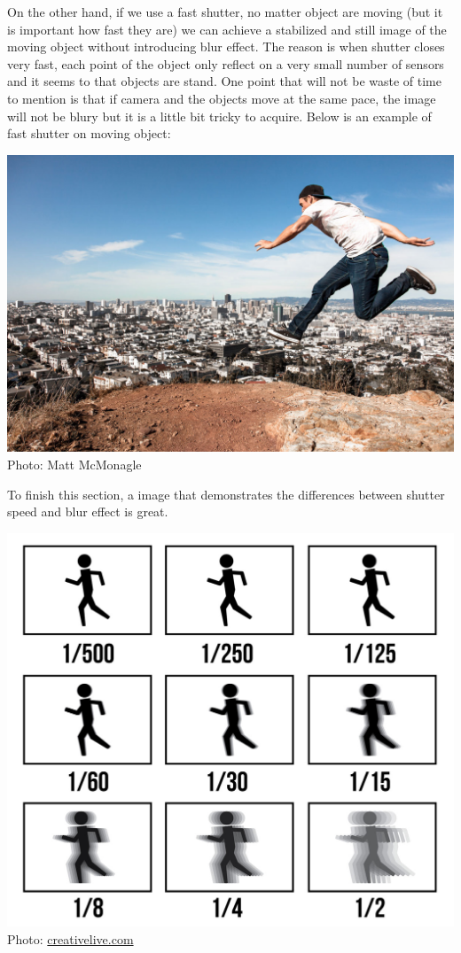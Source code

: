 \documentclass[11pt]{article}
\makeatletter
\def\maxwidth{\ifdim\Gin@nat@width>\linewidth\linewidth
    \else\Gin@nat@width\fi}
\let\Oldincludegraphics\includegraphics
\renewcommand{\includegraphics}[1]{\Oldincludegraphics[width=.8\maxwidth]{#1}}
\makeatother
\begin{document}
On the other hand, if we use a fast shutter, no matter object are moving
(but it is important how fast they are) we can achieve a stabilized and
still image of the moving object without introducing blur effect. The
reason is when shutter closes very fast, each point of the object only
reflect on a very small number of sensors and it seems to that objects
are stand. One point that will not be waste of time to mention is that
if camera and the objects move at the same pace, the image will not be
blury but it is a little bit tricky to acquire. Below is an example of
fast shutter on moving object:

\includegraphics{wiki/freezemotion1.jpg} Photo: Matt McMonagle

To finish this section, a image that demonstrates the differences
between shutter speed and blur effect is great.

\includegraphics{wiki/motionblur2.jpg} Photo:
\href{https://creativelive.com}{creativelive.com}
\end{document}
